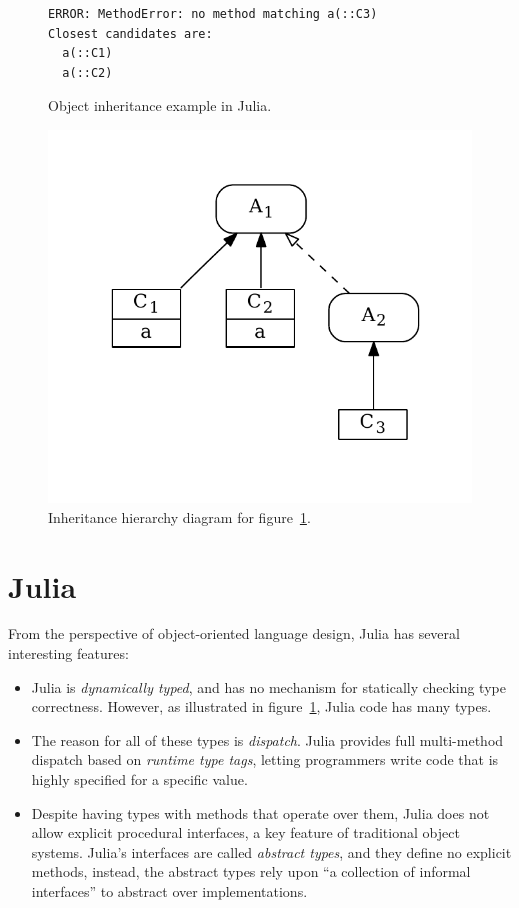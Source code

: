 \documentclass[preprint]{sigplanconf}
\begin{document}
\begin{figure}[h]


\begin{Verbatim}[fontsize=\small]
ERROR: MethodError: no method matching a(::C3)
Closest candidates are:
  a(::C1)
  a(::C2)
\end{Verbatim}
\caption{Object inheritance example in Julia.}
\label{code:broken}
\end{figure}


\begin{figure}
\centering
\includegraphics[scale=.6]{example2.pdf}
\caption{Inheritance hierarchy diagram for figure~\ref{code:broken}.}
\label{fig:algo}
\end{figure}

\section{Julia}

From the perspective of object-oriented language design, Julia has several 
interesting features:
\begin{itemize}
\item Julia is \emph{dynamically typed}, and has no mechanism for statically
checking type correctness. However, as illustrated in figure~\ref{code:broken},
Julia code has many types.
\item The reason for all of these types is \emph{dispatch}. Julia provides 
full multi-method dispatch based on \emph{runtime type tags}, letting programmers
write code that is highly specified for a specific value. 
\item Despite having types with methods that operate over them, Julia does not 
allow explicit procedural interfaces, a key feature of traditional object 
systems. Julia's interfaces are called \emph{abstract types}, and they define no 
explicit methods, instead, the abstract types rely upon ``a collection of informal interfaces''
\cite{juliadocu} to abstract over implementations.
\end{itemize}
\end{document}
